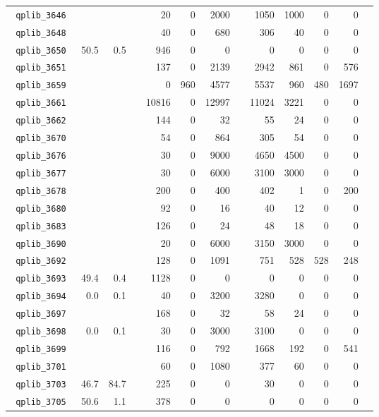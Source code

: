 {\begin{longtable}{lrrrrrrrrrrrr}
\texttt{ 	qplib\_3646	}	&		&		&	&	20	&	0	&	2000	&	&	1050	&	1000	&	0	&	0	\\
\texttt{ 	qplib\_3648	}	&		&		&	&	40	&	0	&	680	&	&	306	&	40	&	0	&	0	\\
\texttt{ 	qplib\_3650	}	&	50.5	&	0.5	&	&	946	&	0	&	0	&	&	0	&	0	&	0	&	0	\\
\texttt{ 	qplib\_3651	}	&		&		&	&	137	&	0	&	2139	&	&	2942	&	861	&	0	&	576	\\
\texttt{ 	qplib\_3659	}	&		&		&	&	0	&	960	&	4577	&	&	5537	&	960	&	480	&	1697	\\
\texttt{ 	qplib\_3661	}	&		&		&	&	10816	&	0	&	12997	&	&	11024	&	3221	&	0	&	0	\\
\texttt{ 	qplib\_3662	}	&		&		&	&	144	&	0	&	32	&	&	55	&	24	&	0	&	0	\\
\texttt{ 	qplib\_3670	}	&		&		&	&	54	&	0	&	864	&	&	305	&	54	&	0	&	0	\\
\texttt{ 	qplib\_3676	}	&		&		&	&	30	&	0	&	9000	&	&	4650	&	4500	&	0	&	0	\\
\texttt{ 	qplib\_3677	}	&		&		&	&	30	&	0	&	6000	&	&	3100	&	3000	&	0	&	0	\\
\texttt{ 	qplib\_3678	}	&		&		&	&	200	&	0	&	400	&	&	402	&	1	&	0	&	200	\\
\texttt{ 	qplib\_3680	}	&		&		&	&	92	&	0	&	16	&	&	40	&	12	&	0	&	0	\\
\texttt{ 	qplib\_3683	}	&		&		&	&	126	&	0	&	24	&	&	48	&	18	&	0	&	0	\\
\texttt{ 	qplib\_3690	}	&		&		&	&	20	&	0	&	6000	&	&	3150	&	3000	&	0	&	0	\\
\texttt{ 	qplib\_3692	}	&		&		&	&	128	&	0	&	1091	&	&	751	&	528	&	528	&	248	\\
\texttt{ 	qplib\_3693	}	&	49.4	&	0.4	&	&	1128	&	0	&	0	&	&	0	&	0	&	0	&	0	\\
\texttt{ 	qplib\_3694	}	&	0.0	&	0.1	&	&	40	&	0	&	3200	&	&	3280	&	0	&	0	&	0	\\
\texttt{ 	qplib\_3697	}	&		&		&	&	168	&	0	&	32	&	&	58	&	24	&	0	&	0	\\
\texttt{ 	qplib\_3698	}	&	0.0	&	0.1	&	&	30	&	0	&	3000	&	&	3100	&	0	&	0	&	0	\\
\texttt{ 	qplib\_3699	}	&		&		&	&	116	&	0	&	792	&	&	1668	&	192	&	0	&	541	\\
\texttt{ 	qplib\_3701	}	&		&		&	&	60	&	0	&	1080	&	&	377	&	60	&	0	&	0	\\
\texttt{ 	qplib\_3703	}	&	46.7	&	84.7	&	&	225	&	0	&	0	&	&	30	&	0	&	0	&	0	\\
\texttt{ 	qplib\_3705	}	&	50.6	&	1.1	&	&	378	&	0	&	0	&	&	0	&	0	&	0	&	0	\\

\end{longtable}}
